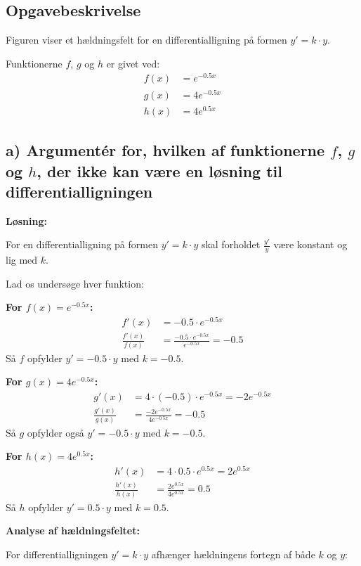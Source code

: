 \documentclass[a4paper,12pt]{article}
\begin{document}
\subsection*{Opgavebeskrivelse}
Figuren viser et hældningsfelt for en differentialligning på formen $y' = k \cdot y$.

Funktionerne $f$, $g$ og $h$ er givet ved:
\begin{align*}
f(x) &= e^{-0.5x} \\
g(x) &= 4e^{-0.5x} \\
h(x) &= 4e^{0.5x}
\end{align*}

\subsection*{a) Argumentér for, hvilken af funktionerne $f$, $g$ og $h$, der ikke kan være en løsning til differentialligningen}

\textbf{Løsning:}

For en differentialligning på formen $y' = k \cdot y$ skal forholdet $\frac{y'}{y}$ være konstant og lig med $k$.

Lad os undersøge hver funktion:

\textbf{For $f(x) = e^{-0.5x}$:}
\begin{align*}
f'(x) &= -0.5 \cdot e^{-0.5x} \\
\frac{f'(x)}{f(x)} &= \frac{-0.5 \cdot e^{-0.5x}}{e^{-0.5x}} = -0.5
\end{align*}
Så $f$ opfylder $y' = -0.5 \cdot y$ med $k = -0.5$.

\textbf{For $g(x) = 4e^{-0.5x}$:}
\begin{align*}
g'(x) &= 4 \cdot (-0.5) \cdot e^{-0.5x} = -2e^{-0.5x} \\
\frac{g'(x)}{g(x)} &= \frac{-2e^{-0.5x}}{4e^{-0.5x}} = -0.5
\end{align*}
Så $g$ opfylder også $y' = -0.5 \cdot y$ med $k = -0.5$.

\textbf{For $h(x) = 4e^{0.5x}$:}
\begin{align*}
h'(x) &= 4 \cdot 0.5 \cdot e^{0.5x} = 2e^{0.5x} \\
\frac{h'(x)}{h(x)} &= \frac{2e^{0.5x}}{4e^{0.5x}} = 0.5
\end{align*}
Så $h$ opfylder $y' = 0.5 \cdot y$ med $k = 0.5$.

\textbf{Analyse af hældningsfeltet:}

For differentialligningen $y' = k \cdot y$ afhænger hældningens fortegn af både $k$ og $y$:
\end{document}
